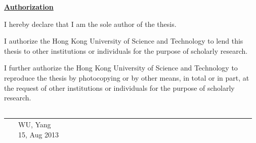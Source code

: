 \begin{center}
{\bf \Large \underline{Authorization}}
\end{center}
\vspace{12mm}

I hereby declare that I am the sole author of the thesis.

\vspace{10mm}

I authorize the Hong Kong University of Science and Technology to lend this
thesis to other institutions or individuals for the purpose of scholarly research.

\vspace{10mm}

I further authorize the Hong Kong University of Science and Technology to
reproduce the thesis by photocopying or by other means, in total or in part, at the
request of other institutions or individuals for the purpose of scholarly research.

\vspace{30mm}

\begin{center}
\underline{~~~~~~~~~~~~~~~~~~~~~~~~~~~~~~~~~~~~~~~~~~~~~~~~~~~~~~~~~~~~~~~~~~~~~~}\\
~~~~WU, Yang \\
~~~~15, Aug 2013

\end{center}
